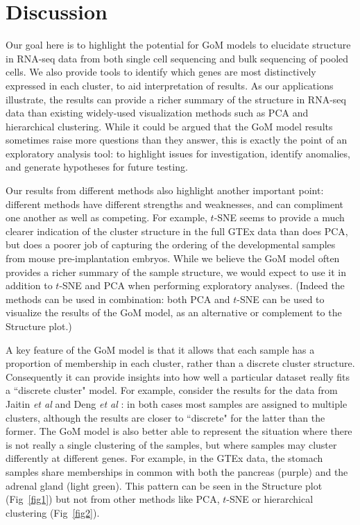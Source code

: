 \documentclass[10pt,letterpaper]{article}
\begin{document}

\section*{Discussion}

Our goal here is to highlight the potential for GoM models to elucidate structure in RNA-seq data from both single cell sequencing and bulk sequencing of pooled cells.
We also provide tools to identify which genes
are most distinctively expressed in each cluster, to aid interpretation of results.
As our applications illustrate, the results can provide a richer summary of the structure in RNA-seq data than existing widely-used visualization methods such as PCA and hierarchical clustering. While it could be argued that the GoM model results sometimes raise more questions than they answer, this is
exactly the point of an exploratory analysis tool: to highlight issues for investigation, identify anomalies, and generate hypotheses for future testing.

Our results from different methods also highlight another important point: different methods have different strengths and weaknesses, and can compliment
one another as well as competing. For example, $t$-SNE seems to provide a much clearer indication of the cluster structure in the full GTEx data than
does PCA, but does a poorer job of capturing the ordering of the developmental samples from mouse pre-implantation embryos. While we believe
the GoM model often provides a richer summary of the sample structure, we would expect to use it in addition to $t$-SNE and PCA when performing exploratory analyses.
(Indeed the methods can be used in combination: both PCA and $t$-SNE can be used to visualize the results of the GoM model, as an alternative or complement to the Structure plot.)

A key feature of the GoM
model is that it allows that each sample has a proportion of membership in each cluster, rather than a discrete cluster structure. Consequently
it can provide insights into how well a
particular dataset really fits a ``discrete cluster" model. For example, consider the results for the data from Jaitin \textit{et al} \cite{Jaitin2014} and Deng \textit{et al} \cite{Deng2014}:
in both cases most samples are assigned to multiple clusters, although the results are closer to ``discrete" for the latter than the former.
The GoM model is also better able to represent the situation where there is not really a single clustering of the samples,
but where samples may cluster differently at different genes. For example, in the GTEx data, the stomach samples share memberships in common with
both the pancreas (purple) and the adrenal gland (light green). This pattern can be seen in the Structure plot (Fig~\ref{fig1}) but not from other methods like PCA, $t$-SNE or hierarchical clustering (Fig~\ref{fig2}).
\end{document}
